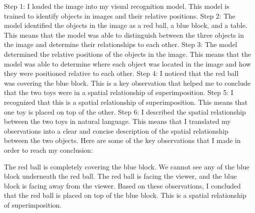 \begin{enumerate}
\begin{enumerate}
        Step 1: I loaded the image into my visual recognition model. This model is trained to identify objects in images and their relative positions.
        Step 2: The model identified the objects in the image as a red ball, a blue block, and a table. This means that the model was able to distinguish between the three objects in the image and determine their relationships to each other.
        Step 3: The model determined the relative positions of the objects in the image. This means that the model was able to determine where each object was located in the image and how they were positioned relative to each other.
        Step 4: I noticed that the red ball was covering the blue block. This is a key observation that helped me to conclude that the two toys were in a spatial relationship of superimposition.
        Step 5: I recognized that this is a spatial relationship of superimposition. This means that one toy is placed on top of the other.
        Step 6: I described the spatial relationship between the two toys in natural language. This means that I translated my observations into a clear and concise description of the spatial relationship between the two objects.
        Here are some of the key observations that I made in order to reach my conclusion:
        
        The red ball is completely covering the blue block.
        We cannot see any of the blue block underneath the red ball.
        The red ball is facing the viewer, and the blue block is facing away from the viewer.
        Based on these observations, I concluded that the red ball is placed on top of the blue block. This is a spatial relationship of superimposition.
        

\end{enumerate}
\end{enumerate}
